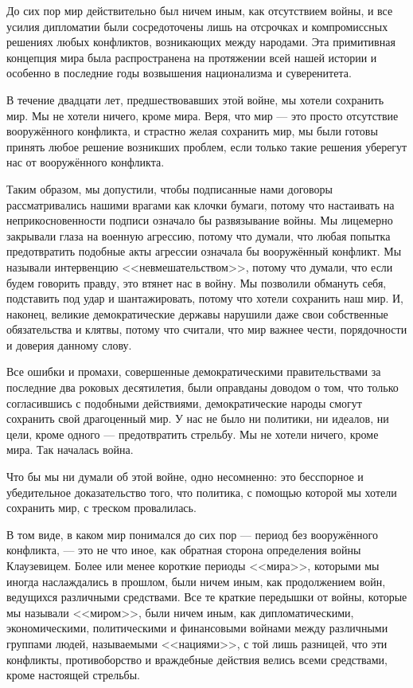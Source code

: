До сих пор мир действительно был ничем иным, как отсутствием войны, и все усилия дипломатии были сосредоточены лишь на отсрочках и компромиссных решениях любых конфликтов, возникающих между народами. Эта примитивная концепция мира была распространена на протяжении всей нашей истории и особенно в последние годы возвышения национализма и суверенитета.

В течение двадцати лет, предшествовавших этой войне, мы хотели сохранить мир. Мы не хотели ничего, кроме мира. Веря, что мир — это просто отсутствие вооружённого конфликта, и страстно желая сохранить мир, мы были готовы принять любое решение возникших проблем, если только такие решения уберегут нас от вооружённого конфликта.

Таким образом, мы допустили, чтобы подписанные нами договоры рассматривались нашими врагами как клочки бумаги, потому что настаивать на неприкосновенности подписи означало бы развязывание войны. Мы лицемерно закрывали глаза на военную агрессию, потому что думали, что любая попытка предотвратить подобные акты агрессии означала бы вооружённый конфликт. Мы называли интервенцию <<невмешательством>>, потому что думали, что если будем говорить правду, это втянет нас в войну. Мы позволили обмануть себя, подставить под удар и шантажировать, потому что хотели сохранить наш мир. И, наконец, великие демократические державы нарушили даже свои собственные обязательства и клятвы, потому что считали, что мир важнее чести, порядочности и доверия данному слову.

Все ошибки и промахи, совершенные демократическими правительствами за последние два роковых десятилетия, были оправданы доводом о том, что только согласившись с подобными действиями, демократические народы смогут сохранить свой драгоценный мир. У нас не было ни политики, ни идеалов, ни цели, кроме одного — предотвратить стрельбу. Мы не хотели ничего, кроме мира. Так началась война.

Что бы мы ни думали об этой войне, одно несомненно: это бесспорное и убедительное доказательство того, что политика, с помощью которой мы хотели сохранить мир, с треском провалилась.

В том виде, в каком мир понимался до сих пор — период без вооружённого конфликта, — это не что иное, как обратная сторона определения войны Клаузевицем. Более или менее короткие периоды <<мира>>, которыми мы иногда наслаждались в прошлом, были ничем иным, как продолжением войн, ведущихся различными средствами. Все те краткие передышки от войны, которые мы называли <<миром>>, были ничем иным, как дипломатическими, экономическими, политическими и финансовыми войнами между различными группами людей, называемыми <<нациями>>, с той лишь разницей, что эти конфликты, противоборство и враждебные действия велись всеми средствами, кроме настоящей стрельбы.


